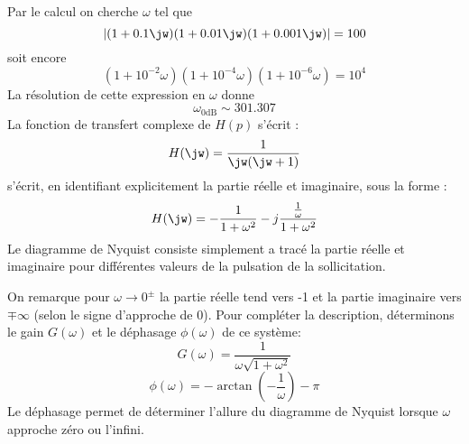Par le calcul on cherche $\omega$ tel que 
\[
\left|(1+0.1\jw)(1+0.01\jw)(1+0.001\jw)\right|=100
\]
soit encore
\[
    (1+10^{-2}\omega)(1+10^{-4}\omega)(1+10^{-6}\omega)=10^4    
\]
La résolution de cette expression en $\omega$ donne
\[
    \omega_{0\si{\dB}}\sim301.307 
\]
\question{}
La fonction de transfert complexe de $H(p)$ s'écrit :
\[
    H(\jw)=\dfrac{1}{\jw(\jw+1)}
\]
s'écrit, en identifiant explicitement la partie réelle et imaginaire, sous la 
forme :
\[
    H(\jw)=-\dfrac{1}{1+\omega^2}-j\dfrac{\frac{1}{\omega}}{1+\omega^2}
\]
Le diagramme de Nyquist consiste simplement a tracé la partie réelle et 
imaginaire pour différentes valeurs de la pulsation de la sollicitation.
\begin{figure}[!t]
    \centering
    
\end{figure}
On remarque pour $\omega\rightarrow0^\pm$ la partie réelle tend vers -1 et la 
partie imaginaire vers $\mp\infty$ (selon le signe d'approche de 0).
Pour compléter la description, déterminons le gain $G(\omega)$ et le déphasage 
$\phi(\omega)$ de ce système:
\[
    G(\omega)=\dfrac{1}{\omega\sqrt{1+\omega^2}}
\]
\[
    \phi(\omega)=-\arctan{\left(-\dfrac{1}{\omega}\right)}-\pi
\]
Le déphasage permet de déterminer l'allure du diagramme de Nyquist 
lorsque $\omega$ approche zéro ou l'infini. 

